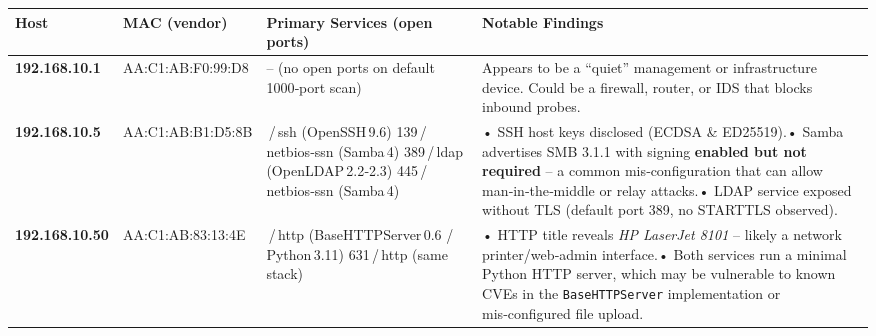 \begin{longtable}[]{@{}
        >{\raggedright\arraybackslash}p{}
        >{\raggedright\arraybackslash}p{}
        >{\raggedright\arraybackslash}p{}
        >{\raggedright\arraybackslash}p{}@{}}
    \toprule\noalign{}
    \begin{minipage}[b]{\linewidth}
                \raggedright
            Host
    \end{minipage} & \begin{minipage}[b]{\linewidth}
                                 \raggedright
                             MAC (vendor)
    \end{minipage} & \begin{minipage}[b]{\linewidth}
                                 \raggedright
                             Primary Services (open ports)
    \end{minipage} & \begin{minipage}[b]{\linewidth}
                                 \raggedright
                             Notable Findings
    \end{minipage} \\
    \midrule\noalign{}
    \endhead
    \bottomrule\noalign{}
    \endlastfoot
    \textbf{192.168.10.1} & AA:C1:AB:F0:99:D8 & -- (no open ports on default
    1000‑port scan) & Appears to be a ``quiet'' management or infrastructure
    device. Could be a firewall, router, or IDS that blocks inbound
    probes. \\
    \textbf{192.168.10.5} & AA:C1:AB:B1:D5:8B & 22\,/\,ssh (OpenSSH\,9.6)
    139\,/\,netbios‑ssn (Samba\,4) 389\,/\,ldap (OpenLDAP\,2.2‑2.3)
    445\,/\,netbios‑ssn (Samba\,4) & • SSH host keys disclosed (ECDSA \&
    ED25519).• Samba advertises SMB 3.1.1 with signing \textbf{enabled but
    not required} -- a common mis‑configuration that can allow
    man‑in‑the‑middle or relay attacks.• LDAP service exposed without TLS
    (default port 389, no STARTTLS observed). \\
    \textbf{192.168.10.50} & AA:C1:AB:83:13:4E & 80\,/\,http
    (BaseHTTPServer\,0.6 / Python\,3.11) 631\,/\,http (same stack) & • HTTP
    title reveals \emph{HP LaserJet 8101} -- likely a network
    printer/web‑admin interface.• Both services run a minimal Python HTTP
    server, which may be vulnerable to known CVEs in the
    \texttt{BaseHTTPServer} implementation or mis‑configured file upload. \\

\end{longtable}
